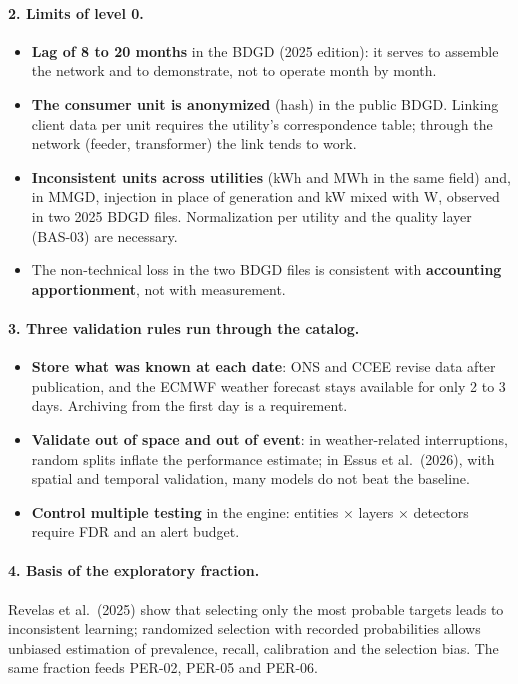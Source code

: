 \paragraph{2. Limits of level 0.}
\begin{itemize}
  \item \textbf{Lag of 8 to 20 months} in the BDGD (2025 edition): it serves
    to assemble the network and to demonstrate, not to operate month by month.
  \item \textbf{The consumer unit is anonymized} (hash) in the public BDGD.
    Linking client data per unit requires the utility's correspondence table;
    through the network (feeder, transformer) the link tends to work.
  \item \textbf{Inconsistent units across utilities} (kWh and MWh in the same
    field) and, in MMGD, injection in place of generation and kW mixed with
    W, observed in two 2025 BDGD files. Normalization per utility and the
    quality layer (BAS-03) are necessary.
  \item The non-technical loss in the two BDGD files is consistent with
    \textbf{accounting apportionment}, not with measurement.
\end{itemize}

\paragraph{3. Three validation rules run through the catalog.}
\begin{itemize}
  \item \textbf{Store what was known at each date}: ONS and CCEE revise data
    after publication, and the ECMWF weather forecast stays available for
    only 2 to 3 days. Archiving from the first day is a requirement.
  \item \textbf{Validate out of space and out of event}: in weather-related
    interruptions, random splits inflate the performance estimate; in Essus
    et al.\ (2026), with spatial and temporal validation, many models do not
    beat the baseline.
  \item \textbf{Control multiple testing} in the engine: entities × layers ×
    detectors require FDR and an alert budget.
\end{itemize}

\paragraph{4. Basis of the exploratory fraction.} Revelas et al.\ (2025) show
that selecting only the most probable targets leads to inconsistent learning;
randomized selection with recorded probabilities allows unbiased estimation
of prevalence, recall, calibration and the selection bias. The same fraction
feeds PER-02, PER-05 and PER-06.

